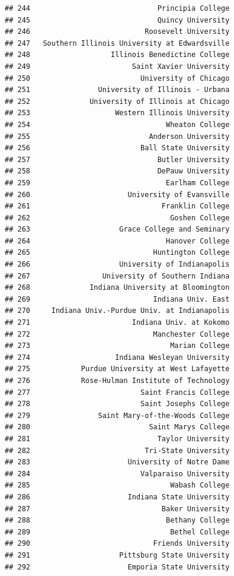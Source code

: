 \documentclass[]{article}
\begin{document}
\begin{verbatim}
## 244                              Principia College
## 245                              Quincy University
## 246                           Roosevelt University
## 247   Southern Illinois University at Edwardsville
## 248                   Illinois Benedictine College
## 249                        Saint Xavier University
## 250                          University of Chicago
## 251                University of Illinois - Urbana
## 252              University of Illinois at Chicago
## 253                    Western Illinois University
## 254                                Wheaton College
## 255                            Anderson University
## 256                          Ball State University
## 257                              Butler University
## 258                              DePauw University
## 259                                Earlham College
## 260                       University of Evansville
## 261                               Franklin College
## 262                                 Goshen College
## 263                     Grace College and Seminary
## 264                                Hanover College
## 265                             Huntington College
## 266                     University of Indianapolis
## 267                 University of Southern Indiana
## 268              Indiana University at Bloomington
## 269                             Indiana Univ. East
## 270     Indiana Univ.-Purdue Univ. at Indianapolis
## 271                        Indiana Univ. at Kokomo
## 272                             Manchester College
## 273                                 Marian College
## 274                    Indiana Wesleyan University
## 275            Purdue University at West Lafayette
## 276            Rose-Hulman Institute of Technology
## 277                          Saint Francis College
## 278                          Saint Josephs College
## 279                Saint Mary-of-the-Woods College
## 280                            Saint Marys College
## 281                              Taylor University
## 282                           Tri-State University
## 283                       University of Notre Dame
## 284                          Valparaiso University
## 285                                 Wabash College
## 286                       Indiana State University
## 287                               Baker University
## 288                                Bethany College
## 289                                 Bethel College
## 290                             Friends University
## 291                     Pittsburg State University
## 292                       Emporia State University

\end{verbatim}
\end{document}

